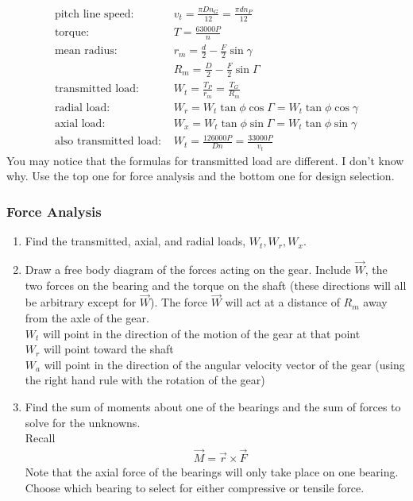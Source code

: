 \documentclass[11pt, fleqn]{article}
\begin{document}
\begin{align*}
    \text{pitch line speed: }&v_t=\frac{\pi Dn_G}{12}=\frac{\pi dn_P}{12}\\
    \text{torque: }&T=\frac{63000P}{n}\\
    \text{mean radius: }&r_m=\frac{d}{2}-\frac{F}{2}\sin\gamma\\
    &R_m=\frac{D}{2}-\frac{F}{2}\sin\Gamma\\
    \text{transmitted load: }&W_t=\frac{T_P}{r_m}=\frac{T_G}{R_m}\\
    \text{radial load: }&W_r=W_t\tan\phi\cos\Gamma=W_t\tan\phi\cos\gamma\\
    \text{axial load: }&W_x=W_t\tan\phi\sin\Gamma=W_t\tan\phi\sin\gamma\\
    \text{also transmitted load: }&W_t=\frac{126000P}{Dn}=\frac{33000P}{v_t}
\end{align*}
You may notice that the formulas for transmitted load are different. I don't know why. Use the top one for force analysis and the bottom one for design selection.

\subsubsection{Force Analysis}
\begin{enumerate}
    \item Find the transmitted, axial, and radial loads, $W_t,W_r,W_x$.
    \item Draw a free body diagram of the forces acting on the gear. Include $\vec{W}$, the two forces on the bearing and the torque on the shaft (these directions will all be arbitrary except for $\vec{W}$). The force $\vec{W}$ will act at a distance of $R_m$ away from the axle of the gear.\\
    $W_t$ will point in the direction of the motion of the gear at that point\\
    $W_r$ will point toward the shaft\\
    $W_a$ will point in the direction of the angular velocity vector of the gear (using the right hand rule with the rotation of the gear)
    \item Find the sum of moments about one of the bearings and the sum of forces to solve for the unknowns.\\
    Recall
    \begin{align*}
        &\vec{M}=\vec{r}\times\vec{F}
    \end{align*}
    Note that the axial force of the bearings will only take place on one bearing. Choose which bearing to select for either compressive or tensile force.
\end{enumerate}
\end{document}
